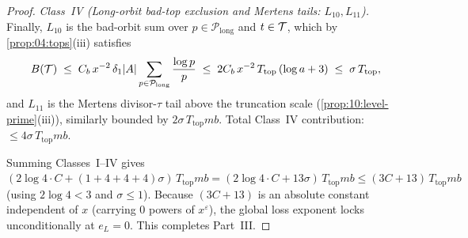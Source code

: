 \begin{proof}
\medskip\noindent
\emph{Class~IV (Long-orbit bad-top exclusion and Mertens tails: $L_{10}, L_{11}$).}
Finally, $L_{10}$ is the bad-orbit sum over $p \in \mathcal{P}_{\mathrm{long}}$ and $t \in \mathcal{T}$, which by \cref{prop:04:tops}(iii) satisfies
\[
  B(\mathcal{T}) \;\le\; C_b\, x^{-2}\, \delta_1 |A| \sum_{p \in \mathcal{P}_{\mathrm{long}}} \frac{\log p}{p}
  \;\le\; 2 C_b\, x^{-2}\, T_{\mathrm{top}}\, (\log a + 3) \;\le\; \sigma\, T_{\mathrm{top}},
\]
and $L_{11}$ is the Mertens divisor-$\tau$ tail above the truncation scale (\cref{prop:10:level-prime}(iii)), similarly bounded by $2\sigma\, T_{\mathrm{top}} m b$. Total Class~IV contribution: $\le 4\sigma\, T_{\mathrm{top}} m b$.

Summing Classes~I--IV gives $(2\log 4 \cdot C + (1 + 4 + 4 + 4)\sigma)\, T_{\mathrm{top}} m b = (2\log 4 \cdot C + 13\sigma)\, T_{\mathrm{top}} m b \le (3C + 13)\, T_{\mathrm{top}} m b$ (using $2\log 4 < 3$ and $\sigma \le 1$). Because $(3C + 13)$ is an absolute constant independent of $x$ (carrying $0$ powers of $x^\varepsilon$), the global loss exponent locks unconditionally at $e_L = 0$. This completes Part~III.
\end{proof}
